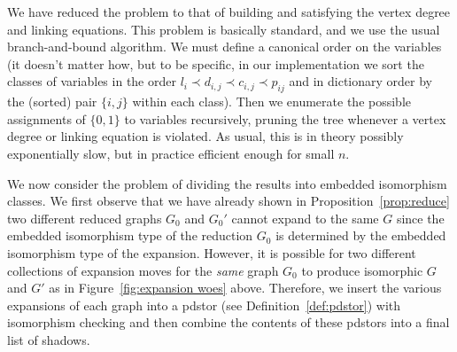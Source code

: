 \documentclass[amsmath,secnumarabic,floatfix,amssymb,nofootinbib,nobibnotes,letterpaper,11pt,tightenlines,showkeys]{revtex4}
\theoremstyle{definition}
\begin{document}
We have reduced the problem to that of building and satisfying the vertex degree and linking equations. This problem is basically standard, and we use the usual branch-and-bound algorithm. We must define a canonical order on the variables (it doesn't matter how, but to be specific, in our implementation we sort the classes of variables in the order $l_i \prec d_{i,j} \prec c_{i,j} \prec p_{ij}$ and in dictionary order by the (sorted) pair $\{i,j\}$ within each class). Then we enumerate the possible assignments of $\{0,1\}$ to variables recursively, pruning the tree whenever a vertex degree or linking equation is violated. As usual, this is in theory possibly exponentially slow, but in practice efficient enough for small $n$.

We now consider the problem of dividing the results into embedded isomorphism classes. We first observe that we have already shown in Proposition~\ref{prop:reduce} two different reduced graphs $G_0$ and $G_0'$ cannot expand to the same $G$ since the embedded isomorphism type of the reduction $G_0$ is determined by the embedded isomorphism type of the expansion. However, it is possible for two different collections of expansion moves for the \emph{same} graph $G_0$ to produce isomorphic $G$ and $G'$ as in Figure~\ref{fig:expansion woes} above. Therefore, we insert the various expansions of each graph into a pdstor (see Definition~\ref{def:pdstor}) with isomorphism checking and then combine the contents of these pdstors into a final list of shadows.
\end{document}
